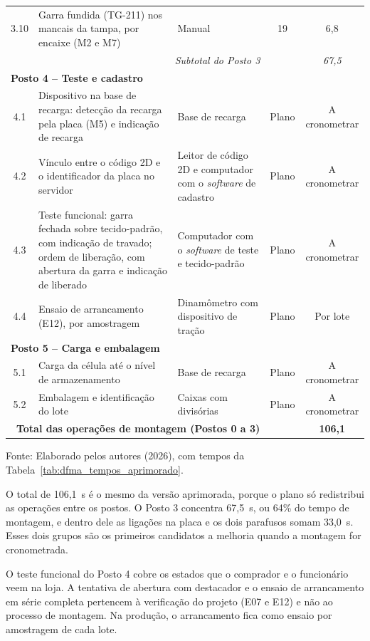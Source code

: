 {\begin{longtable}{@{}c >{\raggedright\arraybackslash}p{5.4cm} >{\raggedright\arraybackslash}p{4.4cm} c c@{}}
3.10 & Garra fundida (TG-211) nos mancais da tampa, por encaixe (M2 e M7) & Manual & 19 & 6,8 \\
\multicolumn{3}{r}{\textit{Subtotal do Posto 3}} & & \textit{67,5} \\
\hline
\multicolumn{5}{l}{\textbf{Posto 4 -- Teste e cadastro}} \\
4.1 & Dispositivo na base de recarga: detecção da recarga pela placa (M5) e indicação de recarga & Base de recarga & Plano & A cronometrar \\
4.2 & Vínculo entre o código 2D e o identificador da placa no servidor & Leitor de código 2D e computador com o \textit{software} de cadastro & Plano & A cronometrar \\
4.3 & Teste funcional: garra fechada sobre tecido-padrão, com indicação de travado; ordem de liberação, com abertura da garra e indicação de liberado & Computador com o \textit{software} de teste e tecido-padrão & Plano & A cronometrar \\
4.4 & Ensaio de arrancamento (E12), por amostragem & Dinamômetro com dispositivo de tração & Plano & Por lote \\
\hline
\multicolumn{5}{l}{\textbf{Posto 5 -- Carga e embalagem}} \\
5.1 & Carga da célula até o nível de armazenamento & Base de recarga & Plano & A cronometrar \\
5.2 & Embalagem e identificação do lote & Caixas com divisórias & Plano & A cronometrar \\
\hline
\multicolumn{3}{r}{\textbf{Total das operações de montagem (Postos 0 a 3)}} & & \textbf{106,1} \\
\end{longtable}
}
\begin{center}
Fonte: Elaborado pelos autores (2026), com tempos da Tabela~\ref{tab:dfma_tempos_aprimorado}.
\end{center}

O total de 106,1~s é o mesmo da versão aprimorada, porque o plano só redistribui as operações entre os postos. O Posto 3 concentra 67,5~s, ou 64\% do tempo de montagem, e dentro dele as ligações na placa e os dois parafusos somam 33,0~s. Esses dois grupos são os primeiros candidatos a melhoria quando a montagem for cronometrada.

O teste funcional do Posto 4 cobre os estados que o comprador e o funcionário veem na loja. A tentativa de abertura com destacador e o ensaio de arrancamento em série completa pertencem à verificação do projeto (E07 e E12) e não ao processo de montagem. Na produção, o arrancamento fica como ensaio por amostragem de cada lote.


